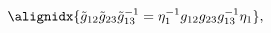 \begin{equation}
  \alignidx{{\tilde g}_{12}{\tilde g}_{23}{\tilde g}_{13}^{-1} =
    \eta_1^{-1}g_{12}g_{23}g_{13}^{-1}\eta_1},
\end{equation}

